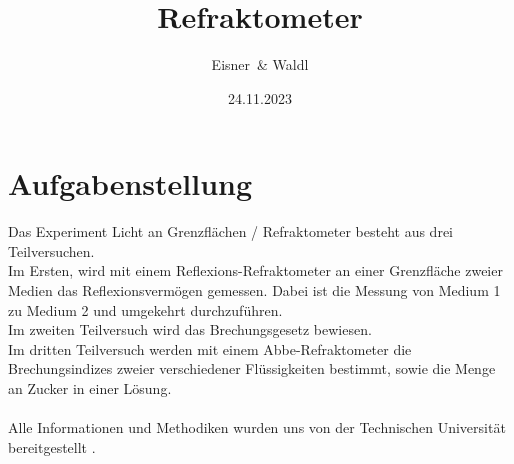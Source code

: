 \documentclass[12pt,a4paper,twoside]{article}
\begin{document}
\newcommand\laboratorynumber{2}
\title{Refraktometer}
\newcommand\supervisor{Ditlbacher, Harald}
\newcommand\groupnumber{42}

\newcommand\participantonelastname{Eisner}
\newcommand\participantonefirstname{Nico}
\newcommand\participantoneid{12214121}
\newcommand\participanttwolastname{Waldl}
\newcommand\participanttwofirstname{Philip}
\newcommand\participanttwoid{12214120}
\author{\participantonelastname \ \& \participanttwolastname}

\newcommand\degreeid{UB 033 678}
\newcommand\semester{23WS}
\date{24.11.2023}

\newcommand\coursetitle{Laborübungen 2: \\ Elektrizität, Magnetismus, Optik}

%



\tableofcontents
\newpage

\section{Aufgabenstellung} %
Das Experiment Licht an Grenzflächen / Refraktometer besteht aus drei Teilversuchen. 
\\
Im Ersten, wird mit einem Reflexions-Refraktometer an einer Grenzfläche zweier Medien das Reflexionsvermögen gemessen. 
Dabei ist die Messung von Medium 1 zu Medium 2 und umgekehrt durchzuführen. 
\\
Im zweiten Teilversuch wird das Brechungsgesetz bewiesen. 
\\
Im dritten Teilversuch werden mit einem Abbe-Refraktometer die Brechungsindizes zweier verschiedener Flüssigkeiten bestimmt, sowie die Menge an Zucker in einer Lösung. 
\\
\\
Alle Informationen und Methodiken wurden uns von der Technischen Universität bereitgestellt \cite{teachcenter2}. 
\end{document}
